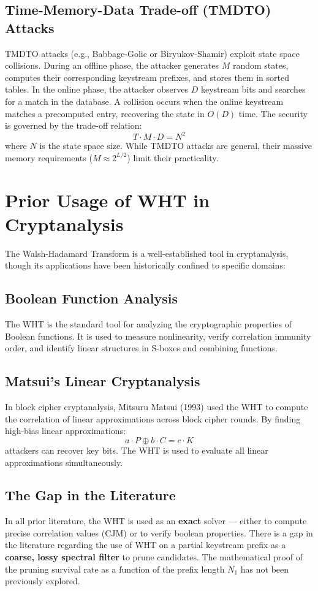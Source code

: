 \subsection{Time-Memory-Data Trade-off (TMDTO) Attacks}
TMDTO attacks (e.g., Babbage-Golic or Biryukov-Shamir) exploit state space collisions. During an offline phase, the attacker generates $M$ random states, computes their corresponding keystream prefixes, and stores them in sorted tables. In the online phase, the attacker observes $D$ keystream bits and searches for a match in the database. A collision occurs when the online keystream matches a precomputed entry, recovering the state in $O(D)$ time. The security is governed by the trade-off relation:
$$T \cdot M \cdot D = N^2$$
where $N$ is the state space size. While TMDTO attacks are general, their massive memory requirements ($M \approx 2^{L/2}$) limit their practicality.

\section{Prior Usage of WHT in Cryptanalysis}
\label{sec:wht_prior_art}

The Walsh-Hadamard Transform is a well-established tool in cryptanalysis, though its applications have been historically confined to specific domains:

\subsection{Boolean Function Analysis}
The WHT is the standard tool for analyzing the cryptographic properties of Boolean functions. It is used to measure nonlinearity, verify correlation immunity order, and identify linear structures in S-boxes and combining functions.

\subsection{Matsui's Linear Cryptanalysis}
In block cipher cryptanalysis, Mitsuru Matsui (1993) used the WHT to compute the correlation of linear approximations across block cipher rounds. By finding high-bias linear approximations:
$$a \cdot P \oplus b \cdot C = c \cdot K$$
attackers can recover key bits. The WHT is used to evaluate all linear approximations simultaneously.

\subsection{The Gap in the Literature}
In all prior literature, the WHT is used as an \textbf{exact} solver — either to compute precise correlation values (CJM) or to verify boolean properties.
There is a gap in the literature regarding the use of WHT on a partial keystream prefix as a \textbf{coarse, lossy spectral filter} to prune candidates. The mathematical proof of the pruning survival rate as a function of the prefix length $N_1$ has not been previously explored.

